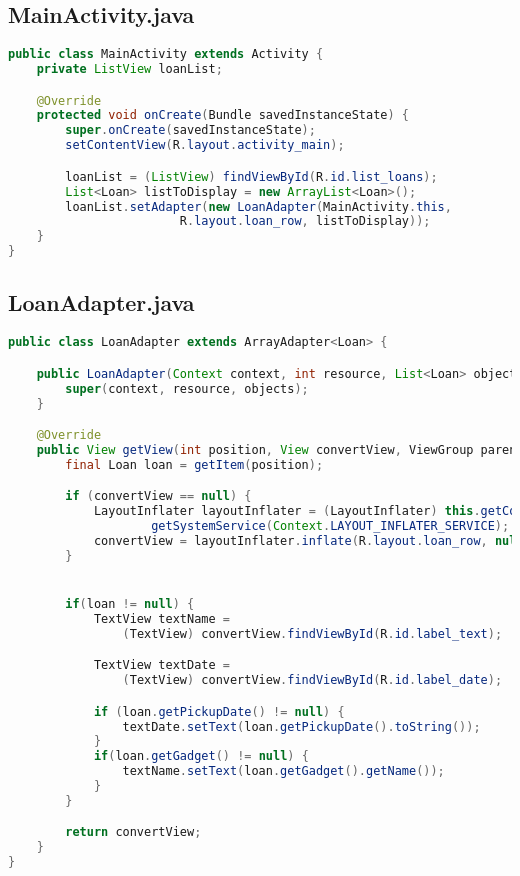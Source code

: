 \documentclass{report}
\begin{document}
\newpage
\subsection* {MainActivity.java}
\begin{lstlisting}[language=Java]
public class MainActivity extends Activity {
	private ListView loanList;

	@Override
	protected void onCreate(Bundle savedInstanceState) {
		super.onCreate(savedInstanceState);
		setContentView(R.layout.activity_main);

		loanList = (ListView) findViewById(R.id.list_loans);
		List<Loan> listToDisplay = new ArrayList<Loan>();
		loanList.setAdapter(new LoanAdapter(MainActivity.this, 
						R.layout.loan_row, listToDisplay));
	}
}
\end{lstlisting}


\subsection* {LoanAdapter.java}
\begin{lstlisting}[language=Java]
public class LoanAdapter extends ArrayAdapter<Loan> {

	public LoanAdapter(Context context, int resource, List<Loan> objects) {
		super(context, resource, objects);
	}

	@Override
	public View getView(int position, View convertView, ViewGroup parent) {
		final Loan loan = getItem(position);

		if (convertView == null) {
			LayoutInflater layoutInflater = (LayoutInflater) this.getContext().
					getSystemService(Context.LAYOUT_INFLATER_SERVICE);
			convertView = layoutInflater.inflate(R.layout.loan_row, null);
		}


		if(loan != null) {
			TextView textName = 
				(TextView) convertView.findViewById(R.id.label_text);

			TextView textDate = 
				(TextView) convertView.findViewById(R.id.label_date);

			if (loan.getPickupDate() != null) {
				textDate.setText(loan.getPickupDate().toString());
			}
			if(loan.getGadget() != null) {
				textName.setText(loan.getGadget().getName());
			}
		}

		return convertView;
	}
}
\end{lstlisting}
\end{document}
